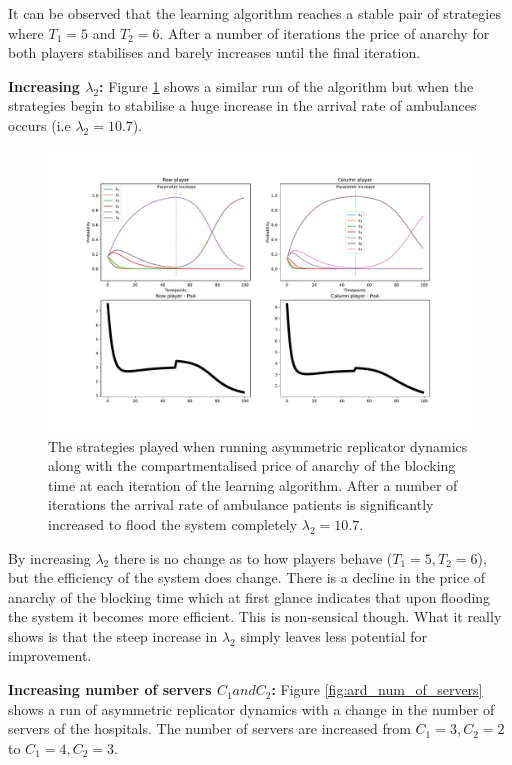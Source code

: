 It can be observed that the learning algorithm reaches a stable pair of 
strategies where \(T_1 = 5\) and \(T_2 = 6\). After a number of iterations the
price of anarchy for both players stabilises and barely increases until the 
final iteration. 

\textbf{Increasing \(\lambda_2\):}
Figure \ref{fig:ard_lambda_2} shows a similar run of the
algorithm but when the strategies begin to stabilise a huge increase in the
arrival rate of ambulances occurs (i.e \( \lambda_2 = 10.7 \)).


\begin{figure}[H]
    \includegraphics[width=\textwidth]{imgs/asymmetric_rd_and_PoA/asymmetric_flooding.pdf}
    \caption{The strategies played when running asymmetric replicator dynamics
    along with the compartmentalised price of anarchy of the blocking time at
    each iteration of the learning algorithm. After a number of iterations the 
    arrival rate of ambulance patients is significantly increased to flood the
    system completely \( \lambda_2 = 10.7 \).}
    \label{fig:ard_lambda_2}
\end{figure}


By increasing \(\lambda_2\) there is no change as to how players behave
(\(T_1 = 5, T_2 = 6\)), but the efficiency of the system does change. 
There is a decline in the price of anarchy of the blocking time which at first 
glance indicates that upon flooding the system it becomes more efficient. 
This is non-sensical though.
What it really shows is that the steep increase in \( \lambda_2 \) simply leaves 
less potential for improvement. 

\textbf{Increasing number of servers \( C_1 and C_2 \):}
Figure \ref{fig:ard_num_of_servers} shows a run of asymmetric replicator 
dynamics with a change in the number of servers of the hospitals.
The number of servers are increased from \(C_1 = 3, C_2 = 2\) to 
\(C_1 = 4, C_2 = 3\).


